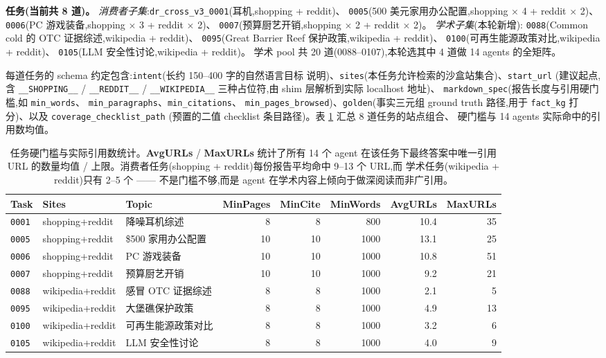 \documentclass[UTF8,11pt]{ctexart}
\begin{document}
\textbf{任务(当前共 8 道)。}
\emph{消费者子集}:\texttt{dr\_cross\_v3\_0001}(耳机,shopping + reddit)、
\texttt{0005}(500 美元家用办公配置,shopping $\times$ 4 + reddit $\times$ 2)、
\texttt{0006}(PC 游戏装备,shopping $\times$ 3 + reddit $\times$ 2)、
\texttt{0007}(预算厨艺开销,shopping $\times$ 2 + reddit $\times$ 2)。
\emph{学术子集}(本轮新增):
\texttt{0088}(Common cold 的 OTC 证据综述,wikipedia + reddit)、
\texttt{0095}(Great Barrier Reef 保护政策,wikipedia + reddit)、
\texttt{0100}(可再生能源政策对比,wikipedia + reddit)、
\texttt{0105}(LLM 安全性讨论,wikipedia + reddit)。
学术 pool 共 20 道(0088--0107),本轮选其中 4 道做 14 agents 的全矩阵。

每道任务的 schema 约定包含:\texttt{intent}(长约 150--400 字的自然语言目标
说明)、\texttt{sites}(本任务允许检索的沙盒站集合)、\texttt{start\_url}
(建议起点,含 \texttt{\_\_SHOPPING\_\_} / \texttt{\_\_REDDIT\_\_} /
\texttt{\_\_WIKIPEDIA\_\_} 三种占位符,由 shim 层解析到实际 localhost 地址)、
\texttt{markdown\_spec}(报告长度与引用硬门槛,如 \texttt{min\_words}、
\texttt{min\_paragraphs}、\texttt{min\_citations}、
\texttt{min\_pages\_browsed})、\texttt{golden}(事实三元组 ground truth
路径,用于 \texttt{fact\_kg} 打分)、以及 \texttt{coverage\_checklist\_path}
(预置的二值 checklist 条目路径)。表 \ref{tab:tasks} 汇总 8 道任务的站点组合、
硬门槛与 14 agents 实际命中的引用数均值。

\begin{table}[h]
  \centering
  \small
  \begin{tabular}{lllrrrrr}
    \toprule
    Task & Sites & Topic & MinPages & MinCite & MinWords & AvgURLs & MaxURLs \\
    \midrule
    \texttt{0001} & shopping+reddit  & 降噪耳机综述         &  8 &  8 &  800 & 10.4 & 35 \\
    \texttt{0005} & shopping+reddit  & \$500 家用办公配置    & 10 & 10 & 1000 & 13.1 & 25 \\
    \texttt{0006} & shopping+reddit  & PC 游戏装备           & 10 & 10 & 1000 & 10.8 & 51 \\
    \texttt{0007} & shopping+reddit  & 预算厨艺开销          & 10 & 10 & 1000 &  9.2 & 21 \\
    \texttt{0088} & wikipedia+reddit & 感冒 OTC 证据综述     &  8 &  8 & 1000 &  2.1 &  5 \\
    \texttt{0095} & wikipedia+reddit & 大堡礁保护政策        &  8 &  8 & 1000 &  4.9 & 13 \\
    \texttt{0100} & wikipedia+reddit & 可再生能源政策对比    &  8 &  8 & 1000 &  3.2 &  6 \\
    \texttt{0105} & wikipedia+reddit & LLM 安全性讨论        &  8 &  8 & 1000 &  4.0 &  9 \\
    \bottomrule
  \end{tabular}
  \caption{任务硬门槛与实际引用数统计。\textbf{AvgURLs} / \textbf{MaxURLs}
    统计了所有 14 个 agent 在该任务下最终答案中唯一引用 URL 的数量均值 /
    上限。消费者任务(shopping + reddit)每份报告平均命中 9--13 个 URL,而
    学术任务(wikipedia + reddit)只有 2--5 个 —— 不是门槛不够,而是 agent
    在学术内容上倾向于做深阅读而非广引用。}
  \label{tab:tasks}
\end{table}
\end{document}
